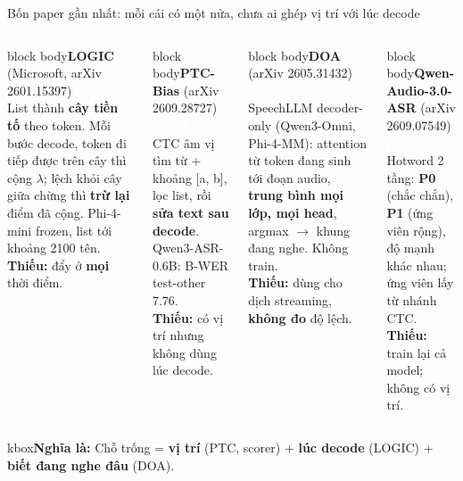 \documentclass[aspectratio=169,xcolor=table]{beamer}
\newcommand{\bad}[1]{\textcolor{RiskRed}{\textbf{#1}}}
\newcommand{\ra}{$\rightarrow$}
\newcommand{\bsz}{\footnotesize}%
\newcommand{\nbox}[2][block body]{\begin{beamercolorbox}[sep=0.45em,rounded=true]{#1}\bsz #2\end{beamercolorbox}}
\newcommand{\nghiala}[1]{\begin{beamercolorbox}[sep=0.32em,rounded=true]{kbox}\bsz\textbf{Nghĩa là:} #1\end{beamercolorbox}}
\newcommand{\tagbox}[2]{{\scriptsize\colorbox{#1}{\textcolor{white}{\textbf{#2}}}}}
\newcommand{\PA}{\tagbox{Primary}{paper}}
\newcommand{\TA}{\tagbox{TextGray}{ta}}
\begin{document}
\begin{frame}{Bốn paper gần nhất: mỗi cái có một nửa, chưa ai ghép vị trí với lúc decode}
\begin{columns}[T]
\nbox{\textbf{LOGIC} (Microsoft, arXiv 2601.15397) \PA\\[1pt]
List thành \textbf{cây tiền tố} theo token. Mỗi bước decode, token đi tiếp được trên cây thì cộng $\lambda$; lệch khỏi cây giữa chừng thì \textbf{trừ lại} điểm đã cộng. Phi-4-mini frozen, list tới khoảng 2100 tên.\\[1pt]
\bad{Thiếu:} đẩy ở \textbf{mọi} thời điểm.}
\vspace{0.06cm}
\nbox{\textbf{PTC-Bias} (arXiv 2609.28727) \PA\\[1pt]
CTC âm vị tìm từ + khoảng [a, b], lọc list, rồi \textbf{sửa text sau decode}. Qwen3-ASR-0.6B: B-WER test-other 7.76.\\[1pt]
\bad{Thiếu:} có vị trí nhưng không dùng lúc decode.}
\nbox{\textbf{DOA} (arXiv 2605.31432) \PA\\[1pt]
SpeechLLM decoder-only (Qwen3-Omni, Phi-4-MM): attention từ token đang sinh tới đoạn audio, \textbf{trung bình mọi lớp, mọi head}, argmax \ra{} khung đang nghe. Không train.\\[1pt]
\bad{Thiếu:} dùng cho dịch streaming, \textbf{không đo} độ lệch.}
\vspace{0.06cm}
\nbox{\textbf{Qwen-Audio-3.0-ASR} (arXiv 2609.07549) \PA\\[1pt]
Hotword 2 tầng: \textbf{P0} (chắc chắn), \textbf{P1} (ứng viên rộng), độ mạnh khác nhau; ứng viên lấy từ nhánh CTC.\\[1pt]
\bad{Thiếu:} train lại cả model; không có vị trí.}
\end{columns}
\vspace{0.06cm}
\nghiala{Chỗ trống = \textbf{vị trí} (PTC, scorer) + \textbf{lúc decode} (LOGIC) + \textbf{biết đang nghe đâu} (DOA). \TA}
\end{frame}
\end{document}
